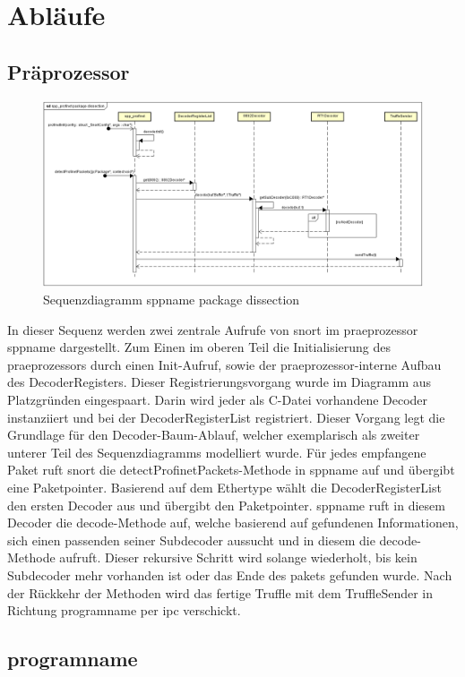 \chapter{Abläufe}

\section{Präprozessor}
\begin{figure}[H]
  \centering
  \includegraphics[width=\textwidth]{../diagramimages/spp-profinet-package-dissection.png}
  \caption[Sequenzdiagramm \gls{sppname} package dissection]{Sequenzdiagramm \gls{sppname} package dissection}
\end{figure}

In dieser Sequenz werden zwei zentrale Aufrufe von \gls{snort} im \gls{praeprozessor} \gls{sppname} dargestellt. Zum Einen im oberen Teil die Initialisierung des \gls{praeprozessor}s durch einen Init-Aufruf, sowie der \gls{praeprozessor}-interne Aufbau des DecoderRegisters. Dieser Registrierungsvorgang wurde im Diagramm aus Platzgründen eingespaart. Darin wird jeder als C-Datei vorhandene Decoder instanziiert und bei der DecoderRegisterList registriert. Dieser Vorgang legt die Grundlage für den Decoder-Baum-Ablauf, welcher exemplarisch als zweiter unterer Teil des Sequenzdiagramms modelliert wurde. Für jedes empfangene Paket ruft \gls{snort} die detectProfinetPackets-Methode in \gls{sppname} auf und übergibt eine Paketpointer. Basierend auf dem Ethertype wählt die DecoderRegisterList den ersten Decoder aus und übergibt den Paketpointer. \gls{sppname} ruft in diesem Decoder die decode-Methode auf, welche basierend auf gefundenen Informationen, sich einen passenden seiner Subdecoder aussucht und in diesem die decode-Methode aufruft. Dieser rekursive Schritt wird solange wiederholt, bis kein Subdecoder mehr vorhanden ist oder das Ende des \gls{paket}s gefunden wurde.
Nach der Rückkehr der Methoden wird das fertige Truffle mit dem TruffleSender in Richtung \gls{programname} per \gls{ipc} verschickt.


\section{\gls{programname}}


 